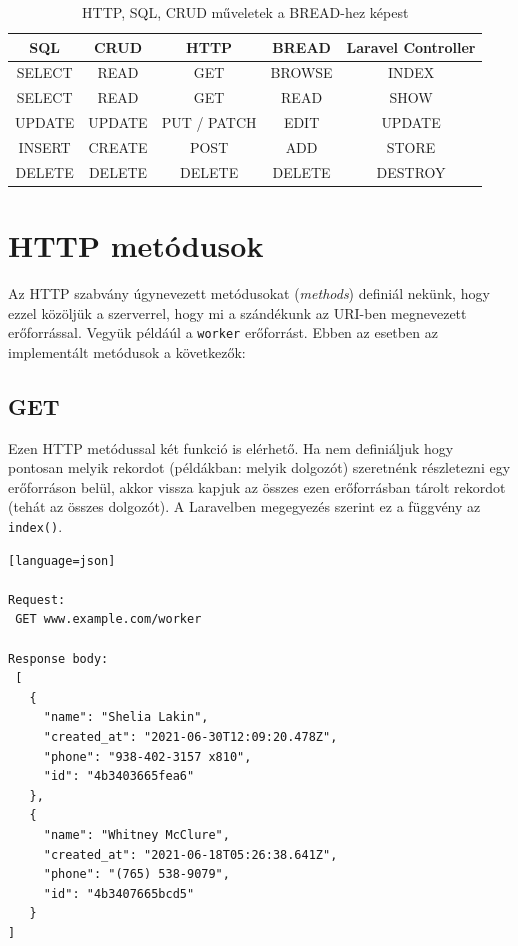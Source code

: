 \documentclass[a4paper,12pt]{thesis-ekf}
\theoremstyle{definition}
\begin{document}
			\begin{table}[h!]
				\centering
				\begin{tabular}{|c|c|c|c|c|}
					\hline
					\textbf{SQL} & \textbf{CRUD} & \textbf{HTTP} & \textbf{BREAD} &\textbf{Laravel Controller} \\ \hline
					SELECT & READ & GET & BROWSE & INDEX \\ \hline
					SELECT & READ & GET & READ & SHOW \\ \hline
					UPDATE & UPDATE & PUT / PATCH & EDIT & UPDATE \\ \hline
					INSERT & CREATE & POST & ADD & STORE \\ \hline
					DELETE & DELETE & DELETE & DELETE & DESTROY \\ \hline
				\end{tabular}
				\caption{HTTP, SQL, CRUD műveletek a BREAD-hez képest}
				\label{table:http-sql-crud-bread}
			\end{table}	
		
		\section{HTTP metódusok}
			Az HTTP szabvány úgynevezett metódusokat (\emph{methods}) definiál nekünk\cite{http}, hogy ezzel közöljük a szerverrel, hogy mi a szándékunk az URI-ben megnevezett erőforrással.\cite{uri} Vegyük példáúl a \verb|worker| erőforrást. Ebben az esetben az implementált metódusok a következők:
			
			\subsection{GET}
				Ezen HTTP metódussal két funkció is elérhető. Ha nem definiáljuk hogy pontosan melyik rekordot (példákban: melyik dolgozót) szeretnénk részletezni egy erőforráson belül, akkor vissza kapjuk az összes ezen erőforrásban tárolt rekordot (tehát az összes dolgozót). A Laravelben megegyezés szerint ez a függvény az \verb|index()|.
\begin{lstlisting}[caption={P\'elda a BROWSE met\'odusra},captionpos=b][language=json]

Request:
 GET www.example.com/worker
 
Response body:
 [
   {
     "name": "Shelia Lakin",
     "created_at": "2021-06-30T12:09:20.478Z",
     "phone": "938-402-3157 x810",
     "id": "4b3403665fea6"
   },
   {
     "name": "Whitney McClure",
     "created_at": "2021-06-18T05:26:38.641Z",
     "phone": "(765) 538-9079",
     "id": "4b3407665bcd5"
   }
]
\end{lstlisting}
				
\end{document}
